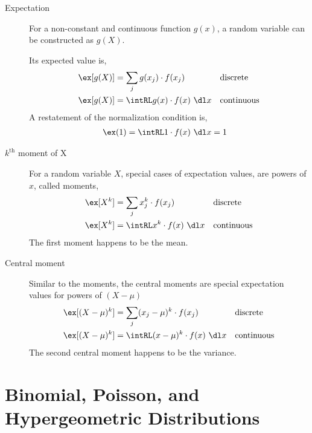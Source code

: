 \begin{description}
    \item[Expectation] For a non-constant and continuous function $ g(x) $, a random
          variable can be constructed as $ g(X) $. \par
          Its expected value is,
          \begin{align}
              \ex[g(X)] & = \sum_j g(x_j) \cdot f(x_j)    &  & \text{discrete}   \\
              \ex[g(X)] & = \intRL g(x) \cdot f(x)\ \dl x &  & \text{continuous}
          \end{align}
          A restatement of the normalization condition is,
          \begin{align}
              \ex(1) & = \intRL 1 \cdot f(x)\ \dl x = 1
          \end{align}

    \item[$k^{\text{th}}$ moment of X] For a random variable $ X $, special cases of
          expectation values, are powers of $ x $, called moments,
          \begin{align}
              \ex[X^k] & = \sum_j x_j^k \cdot f(x_j)    &  & \text{discrete}   \\
              \ex[X^k] & = \intRL x^k \cdot f(x)\ \dl x &  & \text{continuous}
          \end{align}
          The first moment happens to be the mean.

    \item[Central moment] Similar to the moments, the central moments are special
          expectation values for powers of $ (X - \mu) $
          \begin{align}
              \ex[(X - \mu)^k] & = \sum_j (x_j - \mu)^k \cdot f(x_j)    &
                               & \text{discrete}                          \\
              \ex[(X - \mu)^k] & = \intRL (x - \mu)^k \cdot f(x)\ \dl x &
                               & \text{continuous}
          \end{align}
          The second central moment happens to be the variance.
\end{description}

\section{Binomial, Poisson, and Hypergeometric Distributions}

